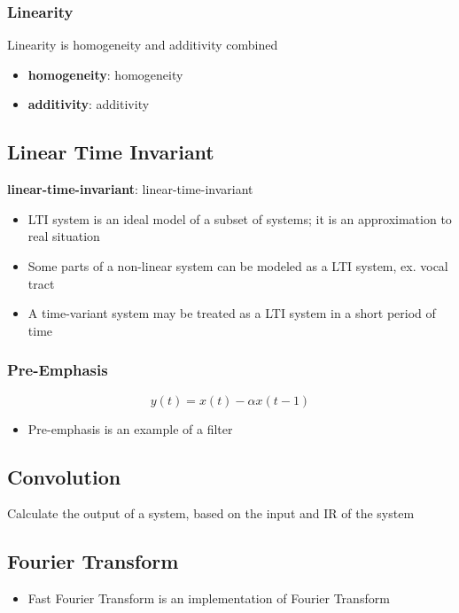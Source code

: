     \subsubsection{Linearity}

      Linearity is \gls{homogeneity} and \gls{additivity} combined

      \begin{itemize}
        \item \textbf{\Gls{homogeneity}}: \glsdesc{homogeneity}
        \item \textbf{\Gls{additivity}}: \glsdesc{additivity}
      \end{itemize}

  \subsection{Linear Time Invariant}

    \textbf{\Gls{linear-time-invariant}}: \glsdesc{linear-time-invariant}

    \begin{itemize}
      \item LTI system is an ideal model of a subset of systems; it is an
      approximation to real situation
      \item Some parts of a non-linear system can be modeled as a LTI system,
      ex. vocal tract
      \item A time-variant system may be treated as a LTI system in a short
      period of time
    \end{itemize}

    \subsubsection{Pre-Emphasis}

      \begin{equation}
        y\left( t \right) = x\left( t \right) - \alpha x\left( t - 1\right)
      \end{equation}

      \begin{itemize}
        \item Pre-emphasis is an example of a filter
      \end{itemize}

  \subsection{Convolution}

    Calculate the output of a system, based on the input and IR of the system

  \subsection{Fourier Transform}

    \begin{itemize}
      \item Fast Fourier Transform is an implementation of Fourier Transform
    \end{itemize}
